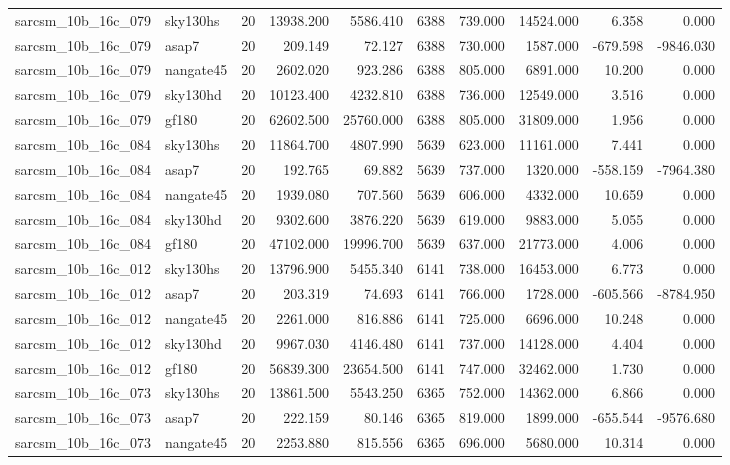 \documentclass{article}
\begin{document}
\begin{longtable}{llrrrrrrrr}
sarcsm\_10b\_16c\_079 & sky130hs & 20 & 13938.200 & 5586.410 & 6388 & 739.000 & 14524.000 & 6.358 & 0.000 \\
sarcsm\_10b\_16c\_079 & asap7 & 20 & 209.149 & 72.127 & 6388 & 730.000 & 1587.000 & -679.598 & -9846.030 \\
sarcsm\_10b\_16c\_079 & nangate45 & 20 & 2602.020 & 923.286 & 6388 & 805.000 & 6891.000 & 10.200 & 0.000 \\
sarcsm\_10b\_16c\_079 & sky130hd & 20 & 10123.400 & 4232.810 & 6388 & 736.000 & 12549.000 & 3.516 & 0.000 \\
sarcsm\_10b\_16c\_079 & gf180 & 20 & 62602.500 & 25760.000 & 6388 & 805.000 & 31809.000 & 1.956 & 0.000 \\
sarcsm\_10b\_16c\_084 & sky130hs & 20 & 11864.700 & 4807.990 & 5639 & 623.000 & 11161.000 & 7.441 & 0.000 \\
sarcsm\_10b\_16c\_084 & asap7 & 20 & 192.765 & 69.882 & 5639 & 737.000 & 1320.000 & -558.159 & -7964.380 \\
sarcsm\_10b\_16c\_084 & nangate45 & 20 & 1939.080 & 707.560 & 5639 & 606.000 & 4332.000 & 10.659 & 0.000 \\
sarcsm\_10b\_16c\_084 & sky130hd & 20 & 9302.600 & 3876.220 & 5639 & 619.000 & 9883.000 & 5.055 & 0.000 \\
sarcsm\_10b\_16c\_084 & gf180 & 20 & 47102.000 & 19996.700 & 5639 & 637.000 & 21773.000 & 4.006 & 0.000 \\
sarcsm\_10b\_16c\_012 & sky130hs & 20 & 13796.900 & 5455.340 & 6141 & 738.000 & 16453.000 & 6.773 & 0.000 \\
sarcsm\_10b\_16c\_012 & asap7 & 20 & 203.319 & 74.693 & 6141 & 766.000 & 1728.000 & -605.566 & -8784.950 \\
sarcsm\_10b\_16c\_012 & nangate45 & 20 & 2261.000 & 816.886 & 6141 & 725.000 & 6696.000 & 10.248 & 0.000 \\
sarcsm\_10b\_16c\_012 & sky130hd & 20 & 9967.030 & 4146.480 & 6141 & 737.000 & 14128.000 & 4.404 & 0.000 \\
sarcsm\_10b\_16c\_012 & gf180 & 20 & 56839.300 & 23654.500 & 6141 & 747.000 & 32462.000 & 1.730 & 0.000 \\
sarcsm\_10b\_16c\_073 & sky130hs & 20 & 13861.500 & 5543.250 & 6365 & 752.000 & 14362.000 & 6.866 & 0.000 \\
sarcsm\_10b\_16c\_073 & asap7 & 20 & 222.159 & 80.146 & 6365 & 819.000 & 1899.000 & -655.544 & -9576.680 \\
sarcsm\_10b\_16c\_073 & nangate45 & 20 & 2253.880 & 815.556 & 6365 & 696.000 & 5680.000 & 10.314 & 0.000 \\

\end{longtable}
\end{document}
